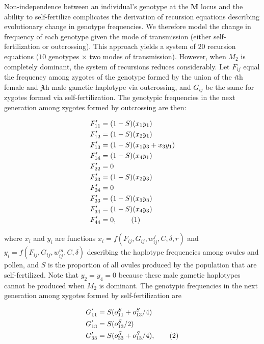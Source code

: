 \documentclass[9pt,twocolumn,twoside,lineno]{gsajnl}
\newcommand\numberthis{\addtocounter{equation}{1}\tag{\theequation}}
\begin{document}
Non-independence between an individual's genotype at the $\mathbf{M}$ locus and the ability to self-fertilize complicates the derivation of recursion equations describing evolutionary change in genotype frequencies. We therefore model the change in frequency of each genotype given the mode of transmission (either self-fertilization or outcrossing). This approach yields a system of $20$ recursion equations ($10$ genotypes $\times$ two modes of transmission). However, when $M_2$ is completely dominant, the system of recursions reduces considerably. Let $F_{ij}$ equal the frequency among zygotes of the genotype formed by the union of the \textit{i}th female and \textit{j}th male gametic haplotype via outcrossing, and $G_{ij}$ be the same for zygotes formed via self-fertilization. The genotypic frequencies in the next generation among zygotes formed by outcrossing are then:
\begin{linenomath}\begin{align*} \label{eq:FprGyn}
    F'_{11} &= (1 - S) (x_1 y_1)  \\
    F'_{12} &= (1 - S) (x_2 y_1)  \\
    F'_{13} &= (1 - S) (x_1 y_3 + x_3 y_1)  \\
    F'_{14} &= (1 - S) (x_4 y_1)  \\
    F'_{22} &= 0 \\
    F'_{23} &= (1 - S) (x_2 y_3)  \\
    F'_{24} &= 0 \\
    F'_{33} &= (1 - S) (x_3 y_3)  \\
    F'_{34} &= (1 - S) (x_4 y_3)  \\
    F'_{44} &= 0, \numberthis
\end{align*}\end{linenomath}

\noindent where $x_{i}$ and $y_{i}$ are functions $x_i=f(F_{ij},G_{ij},w^f_{ij},C,\delta,r)$ and $y_i=f(F_{ij},G_{ij},w^m_{ij},C,\delta)$ describing the haplotype frequencies among ovules and pollen, and $S$ is the proportion of all ovules produced by the population that are self-fertilized. Note that $y_2=y_4=0$ because these male gametic haplotypes cannot be produced when $M_2$ is dominant. The genotypic frequencies in the next generation among zygotes formed by self-fertilization are 
\begin{linenomath}\begin{align*} \label{eq:GprGyn}
    G'_{11} &= S (o^S_{11} + o^S_{13}/4) \\
    G'_{13} &= S (o^S_{13}/2) \\
    G'_{33} &= S (o^S_{33} + o^S_{13}/4), \numberthis
\end{align*} \end{linenomath}
\end{document}
